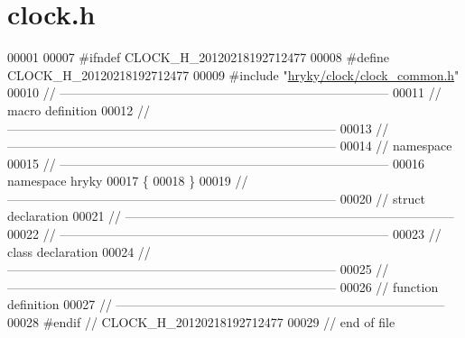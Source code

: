 \hypertarget{clock_8h_source}{\section{clock.\-h}
}

\begin{DoxyCode}
00001 
00007 \textcolor{preprocessor}{#ifndef CLOCK\_H\_20120218192712477}
00008 \textcolor{preprocessor}{}\textcolor{preprocessor}{#define CLOCK\_H\_20120218192712477}
00009 \textcolor{preprocessor}{}\textcolor{preprocessor}{#include "\hyperlink{clock__common_8h}{hryky/clock/clock_common.h}"}
00010 \textcolor{comment}{//
      ------------------------------------------------------------------------------}
00011 \textcolor{comment}{// macro definition}
00012 \textcolor{comment}{//
      ------------------------------------------------------------------------------}
00013 \textcolor{comment}{//
      ------------------------------------------------------------------------------}
00014 \textcolor{comment}{// namespace}
00015 \textcolor{comment}{//
      ------------------------------------------------------------------------------}
00016 \textcolor{keyword}{namespace }hryky
00017 \{
00018 \}
00019 \textcolor{comment}{//
      ------------------------------------------------------------------------------}
00020 \textcolor{comment}{// struct declaration}
00021 \textcolor{comment}{//
      ------------------------------------------------------------------------------}
00022 \textcolor{comment}{//
      ------------------------------------------------------------------------------}
00023 \textcolor{comment}{// class declaration}
00024 \textcolor{comment}{//
      ------------------------------------------------------------------------------}
00025 \textcolor{comment}{//
      ------------------------------------------------------------------------------}
00026 \textcolor{comment}{// function definition}
00027 \textcolor{comment}{//
      ------------------------------------------------------------------------------}
00028 \textcolor{preprocessor}{#endif // CLOCK\_H\_20120218192712477}
00029 \textcolor{preprocessor}{}\textcolor{comment}{// end of file}
\end{DoxyCode}
